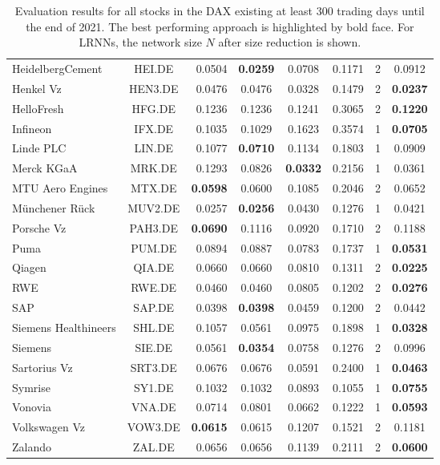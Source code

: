 \documentclass[preprint,12pt,times,authoryear]{elsarticle}%
\theoremstyle{definition}
\begin{document}
\begin{table}
\begin{tabular}{l@{ }crccccc}
HeidelbergCement & HEI.DE & 0.0504 & \textbf{0.0259} & 0.0708 & 0.1171 & 2 & 0.0912\\
Henkel Vz & HEN3.DE & 0.0476 & 0.0476 & 0.0328 & 0.1479 & 2 & \textbf{0.0237}\\
HelloFresh & HFG.DE & 0.1236 & 0.1236 & 0.1241 & 0.3065 & 2 & \textbf{0.1220}\\
Infineon & IFX.DE & 0.1035 & 0.1029 & 0.1623 & 0.3574 & 1 & \textbf{0.0705}\\
Linde PLC & LIN.DE & 0.1077 & \textbf{0.0710} & 0.1134 & 0.1803 & 1 & 0.0909\\
Merck KGaA & MRK.DE & 0.1293 & 0.0826 & \textbf{0.0332} & 0.2156 & 1 & 0.0361\\
MTU Aero Engines & MTX.DE & \textbf{0.0598} & 0.0600 & 0.1085 & 0.2046 & 2 & 0.0652\\
Münchener Rück & MUV2.DE & 0.0257 & \textbf{0.0256} & 0.0430 & 0.1276 & 1 & 0.0421\\
Porsche Vz & PAH3.DE & \textbf{0.0690} & 0.1116 & 0.0920 & 0.1710 & 2 & 0.1188\\
Puma & PUM.DE & 0.0894 & 0.0887 & 0.0783 & 0.1737 & 1 & \textbf{0.0531}\\
Qiagen & QIA.DE & 0.0660 & 0.0660 & 0.0810 & 0.1311 & 2 & \textbf{0.0225}\\
RWE & RWE.DE & 0.0460 & 0.0460 & 0.0805 & 0.1202 & 2 & \textbf{0.0276}\\
SAP & SAP.DE & 0.0398 & \textbf{0.0398} & 0.0459 & 0.1200 & 2 & 0.0442\\
Siemens Healthineers & SHL.DE & 0.1057 & 0.0561 & 0.0975 & 0.1898 & 1 & \textbf{0.0328}\\
Siemens & SIE.DE & 0.0561 & \textbf{0.0354} & 0.0758 & 0.1276 & 2 & 0.0996\\
Sartorius Vz & SRT3.DE & 0.0676 & 0.0676 & 0.0591 & 0.2400 & 1 & \textbf{0.0463}\\
Symrise & SY1.DE & 0.1032 & 0.1032 & 0.0893 & 0.1055 & 1 & \textbf{0.0755}\\
Vonovia & VNA.DE & 0.0714 & 0.0801 & 0.0662 & 0.1222 & 1 & \textbf{0.0593}\\
Volkswagen Vz & VOW3.DE & \textbf{0.0615} & 0.0615 & 0.1207 & 0.1521 & 2 & 0.1181\\
Zalando & ZAL.DE & 0.0656 & 0.0656 & 0.1139 & 0.2111 & 2 & \textbf{0.0600}\\
\bottomrule
\end{tabular}
\caption{Evaluation results for all stocks in the DAX existing at least 300
trading days until the end of 2021. The best performing
approach is highlighted by bold face. For LRNNs, the network size $N$ after size
reduction is shown.}
\label{dax}
\end{table}
\end{document}
